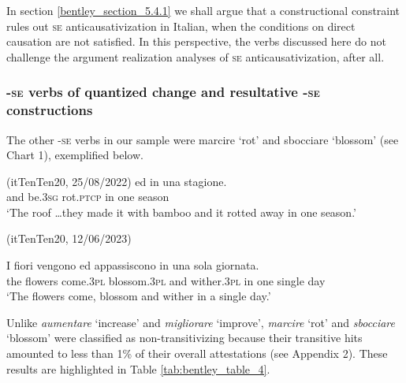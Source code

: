 \documentclass[output=paper,colorlinks,citecolor=brown
]{langscibook}
\begin{document}
In section \ref{bentley_section_5.4.1} we shall argue that a constructional constraint rules out \textsc{se} anticausativization in Italian, when the conditions on direct causation are not satisfied. In this perspective, the verbs discussed here do not challenge the argument realization analyses of \textsc{se} anticausativization, after all.

\subsubsection{-\textsc{se} verbs of quantized change and resultative -\textsc{se} constructions}
\label{bentley_section_3.3.2}

The other -\textsc{se} verbs in our sample were marcire ‘rot’ and sbocciare ‘blossom’ (see Chart 1), exemplified below.

\hspace*{\fill}(itTenTen20, 25/08/2022)\quad
\ea \label{bentley_example_14}
    ed		 						in	una	stagione.  \\
 {} 				and	be.3\textsc{sg}	rot.\textsc{ptcp}		in	one	season \\
    \glt 			‘The roof  \ldots  they made it with bamboo and it rotted away in one season.’
\z



\hspace*{\fill}(itTenTen20, 12/06/2023)\quad

\ea \label{bentley_example_15}
    \gll I			fiori				vengono						ed		appassiscono	in 	una sola			giornata. \\
 the	flowers	come.3\textsc{pl}		blossom.3\textsc{pl}	and	wither.3\textsc{pl}				in		one	single	day \\
    \glt 				‘The flowers come, blossom and wither in a single day.’
\z

Unlike \textit{aumentare} ‘increase’ and \textit{migliorare} ‘improve’, \textit{marcire} ‘rot’ and \textit{sbocciare} ‘blossom’ were classified as non-transitivizing because their transitive hits amounted to less than 1\% of their overall attestations (see Appendix 2). These results are highlighted in Table \ref{tab:bentley_table_4}.
\end{document}
